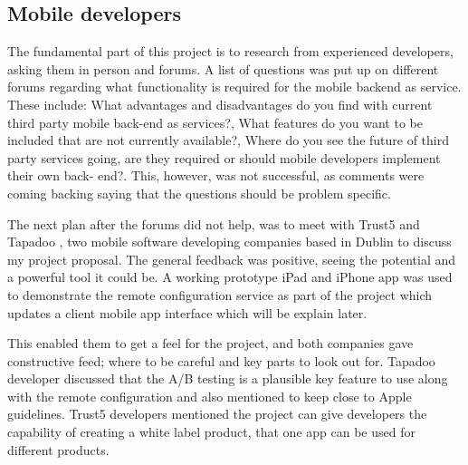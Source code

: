 


\subsection{Mobile developers}

The fundamental part of this project is to research from experienced developers, asking them in person and forums. A list of questions was put up on different forums regarding what functionality is required for the mobile backend as service. These include: What advantages and disadvantages do you find with current third party mobile back-end as services?, What features do you want to be included that are not currently available?, Where do you see the future of third party services going, are they required or should mobile developers implement their own back- end?. This, however, was not successful, as comments were coming backing saying that the questions should be problem specific.

The next plan after the forums did not help, was to meet with Trust5  \cite{trust5} and Tapadoo \cite{tapadoo}, two mobile software developing companies based in Dublin to discuss my project proposal. The general feedback was positive, seeing the potential and a powerful tool it could be. A working prototype iPad and iPhone app was used to demonstrate the remote configuration service as part of the project which updates a client mobile app interface which will be explain later. 

This enabled them to get a feel for the project, and both companies gave constructive feed; where to be careful and key parts to look out for. Tapadoo developer discussed that the A/B testing is a plausible key feature to use along with the remote configuration and also mentioned to keep close to Apple guidelines. Trust5 developers mentioned the project can give developers the capability of creating a white label product, that one app can be used for different products.

